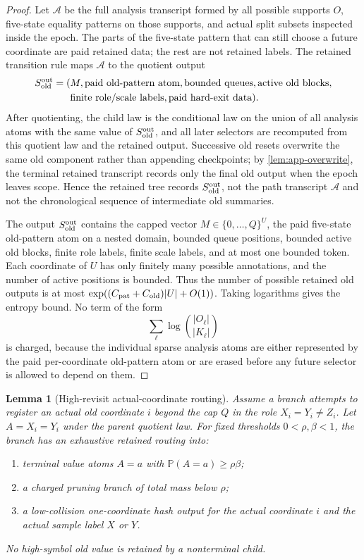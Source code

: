 \documentclass[11pt]{article}
\newcommand{\Cref}[1]{\ref{#1}}
\newtheorem{lemma}[theorem]{Lemma}
\theoremstyle{remark}
\newcommand{\Prob}{\mathbb P}
\newcommand{\old}{\mathrm{old}}
\begin{document}
\begin{proof}
Let $\mathcal A$ be the full analysis transcript formed by all possible supports $O$, five-state equality patterns on those supports, and actual split subsets inspected inside the epoch.  The parts of the five-state pattern that can still choose a future coordinate are paid retained data; the rest are not retained labels.  The retained transition rule maps $\mathcal A$ to the quotient output
\[
\begin{aligned}
        S_{\old}^{\rm out}
        =(&M,\hbox{paid old-pattern atom},\hbox{bounded queues},
          \hbox{active old blocks},\\
          &\hbox{finite role/scale labels},\hbox{paid hard-exit data}).
\end{aligned}
\]
After quotienting, the child law is the conditional law on the union of all analysis atoms with the same value of $S_{\old}^{\rm out}$, and all later selectors are recomputed from this quotient law and the retained output.  Successive old resets overwrite the same old component rather than appending checkpoints; by \Cref{lem:app-overwrite}, the terminal retained transcript records only the final old output when the epoch leaves scope.  Hence the retained tree records $S_{\old}^{\rm out}$, not the path transcript $\mathcal A$ and not the chronological sequence of intermediate old summaries.

The output $S_{\old}^{\rm out}$ contains the capped vector $M\in\{0,\ldots,Q\}^{U}$, the paid five-state old-pattern atom on a nested domain, bounded queue positions, bounded active old blocks, finite role labels, finite scale labels, and at most one bounded token.  Each coordinate of $U$ has only finitely many possible annotations, and the number of active positions is bounded.  Thus the number of possible retained old outputs is at most $\exp((C_{\rm pat}+C_{\old})|U|+O(1))$.  Taking logarithms gives the entropy bound.  No term of the form
\[
        \sum_{\ell}\log\binom{|O_\ell|}{|K_\ell|}
\]
is charged, because the individual sparse analysis atoms are either represented by the paid per-coordinate old-pattern atom or are erased before any future selector is allowed to depend on them.
\end{proof}

\begin{lemma}[High-revisit actual-coordinate routing]\label{lem:crit-high-revisit}
Assume a branch attempts to register an actual old coordinate $i$ beyond the cap $Q$ in the role $X_i=Y_i\ne Z_i$.  Let $A=X_i=Y_i$ under the parent quotient law.  For fixed thresholds $0<\rho,\beta<1$, the branch has an exhaustive retained routing into:
\begin{enumerate}[label=\textup{(\roman*)}]
\item terminal value atoms $A=a$ with $\Prob(A=a)\ge \rho\beta$;
\item a charged pruning branch of total mass below $\rho$;
\item a low-collision one-coordinate hash output for the actual coordinate $i$ and the actual sample label $X$ or $Y$.
\end{enumerate}
No high-symbol old value is retained by a nonterminal child.
\end{lemma}
\end{document}
